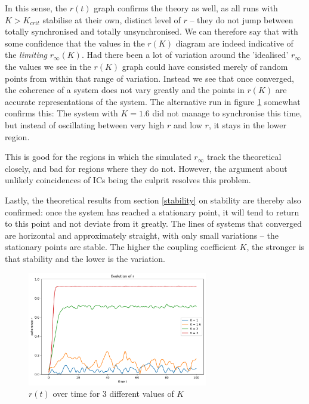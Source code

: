 \documentclass[11pt,a4paper]{article}
\newcommand{\graph}{\medskip\noindent}
\begin{document}
In this sense, the $r(t)$ graph confirms the theory as well, as all runs with $K>K_{crit}$ stabilise at their own, distinct level of $r$ -- they do not jump between totally synchronised and totally unsynchronised.
We can therefore say that with some confidence that the values in the $r(K)$ diagram are indeed indicative of the \textit{limiting} $r_\infty(K)$. 
Had there been a lot of variation around the 'idealised' $r_\infty$ the values we see in the $r(K)$ graph could have consisted merely of random points from within that range of variation. 
Instead we see that once converged, the coherence of a system does not vary greatly and the points in $r(K)$ are accurate representations of the system. 
The alternative run in figure \ref{2alt} somewhat confirms this:
The system with $K=1.6$ did not manage to synchronise this time, but instead of oscillating between very high $r$ and low $r$, it stays in the lower region.

This is good for the regions in which the simulated $r_\infty$ track the theoretical closely, and bad for regions where they do not. 
However, the argument about unlikely coincidences of ICs being the culprit resolves this problem. 

\graph
Lastly, the theoretical results from section \ref{stability} on stability are thereby also confirmed: 
once the system has reached a stationary point, it will tend to return to this point and not deviate from it greatly. 
The lines of systems that converged are horizontal and approximately straight, with only small variations -- the stationary points are stable.
The higher the coupling coefficient $K$, the stronger is that stability and the lower is the variation.




\begin{figure}[h]
	\centering
	\includegraphics[width=0.7\textwidth]{graphics/2_t-vs-r_omegaDistr=normal_N=1000_1611746987.pdf}
	\caption{$r(t)$ over time for 3 different values of $K$}
	\label{2alt}
\end{figure}
\end{document}

